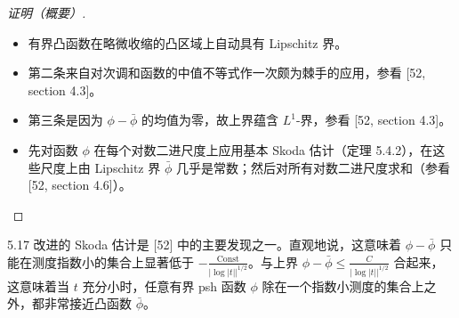 \begin{proof}[证明（概要）]
\begin{itemize}
\item 有界凸函数在略微收缩的凸区域上自动具有 Lipschitz 界。
\item 第二条来自对次调和函数的中值不等式作一次颇为棘手的应用，参看 [52, section 4.3]。
\item 第三条是因为 $\phi-\bar\phi$ 的均值为零，故上界蕴含 $L^1$-界，参看 [52, section 4.3]。
\item 先对函数 $\phi$ 在每个对数二进尺度上应用基本 Skoda 估计（定理 5.4.2），在这些尺度上由 Lipschitz 界 $\bar\phi$ 几乎是常数；然后对所有对数二进尺度求和（参看 [52, section 4.6]）。\proofend
\end{itemize}
\end{proof}


\begin{remark}{5.17}
改进的 Skoda 估计是 [52] 中的主要发现之一。直观地说，这意味着 $\phi-\bar\phi$ 只能在测度指数小的集合上显著低于 $-\frac{\mathrm{Const}}{|\log|t||^{1/2}}$。与上界 $\phi-\bar\phi\le\frac{C}{|\log|t||^{1/2}}$ 合起来，这意味着当 $t$ 充分小时，任意有界 psh 函数 $\phi$ 除在一个指数小测度的集合上之外，都非常接近凸函数 $\bar\phi$。
\end{remark}

